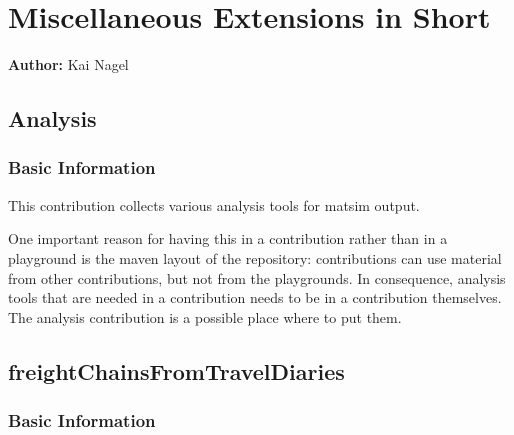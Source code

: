 \chapter{Miscellaneous Extensions in Short}
\label{ch:misccontribs}

\hfill \textbf{Author:} Kai Nagel

\section{Analysis}
\label{sec:contrib-analysis}

\subsection{Basic Information}


This \gls{contribution} collects various analysis tools for \gls{matsim} output.  

One important reason for having this in a \gls{contribution} rather than in a playground is the \gls{maven} layout of the repository: \Glspl{contribution} can use material from other \glspl{contribution}, but not from the playgrounds. 
In consequence, analysis tools that are needed in a \gls{contribution} needs to be in a \gls{contribution} themselves. 
The analysis \gls{contribution} is a possible place where to put them.

\section{freightChainsFromTravelDiaries}
\label{sec:freightChainsFromTravelDiaries}

\subsection{Basic Information}

